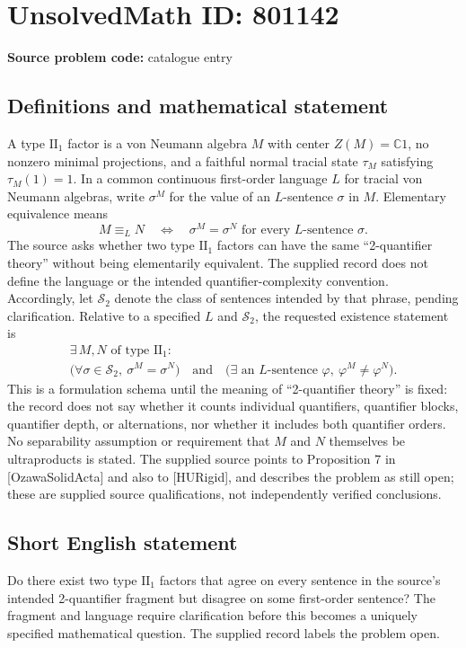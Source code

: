 \documentclass[11pt]{article}
\newcommand{\C}{\mathbb{C}}
\begin{document}
\section*{UnsolvedMath ID: 801142}
\textbf{Source problem code:} catalogue entry
\subsection{Definitions and mathematical statement}
A type \(\mathrm{II}_1\) factor is a von Neumann algebra \(M\) with center \(Z(M)=\C 1\), no nonzero minimal projections, and a faithful normal tracial state \(\tau_M\) satisfying \(\tau_M(1)=1\). In a common continuous first-order language \(L\) for tracial von Neumann algebras, write \(\sigma^M\) for the value of an \(L\)-sentence \(\sigma\) in \(M\). Elementary equivalence means
\[
M\equiv_L N
\quad\Longleftrightarrow\quad
\sigma^M=\sigma^N\text{ for every }L\text{-sentence }\sigma.
\]
The source asks whether two type \(\mathrm{II}_1\) factors can have the same ``2-quantifier theory'' without being elementarily equivalent. The supplied record does not define the language or the intended quantifier-complexity convention. Accordingly, let \(\mathcal S_2\) denote the class of sentences intended by that phrase, pending clarification. Relative to a specified \(L\) and \(\mathcal S_2\), the requested existence statement is
\[
\begin{gathered}
\exists\, M,N\text{ of type }\mathrm{II}_1:\\
\bigl(\forall\sigma\in\mathcal S_2,\ \sigma^M=\sigma^N\bigr)
\quad\text{and}\quad
\bigl(\exists\text{ an }L\text{-sentence }\varphi,\ \varphi^M\ne\varphi^N\bigr).
\end{gathered}
\]
This is a formulation schema until the meaning of ``2-quantifier theory'' is fixed: the record does not say whether it counts individual quantifiers, quantifier blocks, quantifier depth, or alternations, nor whether it includes both quantifier orders. No separability assumption or requirement that \(M\) and \(N\) themselves be ultraproducts is stated. The supplied source points to Proposition 7 in [OzawaSolidActa] and also to [HURigid], and describes the problem as still open; these are supplied source qualifications, not independently verified conclusions.
\subsection{Short English statement}
Do there exist two type \(\mathrm{II}_1\) factors that agree on every sentence in the source's intended 2-quantifier fragment but disagree on some first-order sentence? The fragment and language require clarification before this becomes a uniquely specified mathematical question. The supplied record labels the problem open.
\end{document}
